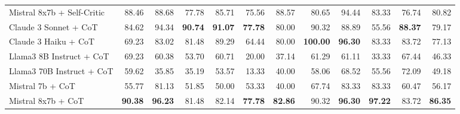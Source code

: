 \begin{table}[H]
{\begin{tabular}{lrrrrrrrrrrr}
\rowcolor{Gray}
Mistral 8x7b + Self-Critic & 88.46 & 88.68 & 77.78 & 85.71 & 75.56 & 88.57 & 80.65 & 94.44 & 83.33 & 76.74 & 80.82 \\
Claude 3 Sonnet + CoT & 84.62 & 94.34 & \textbf{90.74} & \textbf{91.07} & \textbf{77.78} & 80.00 & 90.32 & 88.89 & 55.56 & \textbf{88.37} & 79.17 \\
Claude 3 Haiku + CoT & 69.23 & 83.02 & 81.48 & 89.29 & 64.44 & 80.00 & \textbf{100.00} & \textbf{96.30} & 83.33 & 83.72 & 77.13 \\
Llama3 8B Instruct + CoT & 69.23 & 60.38 & 53.70 & 60.71 & 20.00 & 37.14 & 61.29 & 61.11 & 33.33 & 67.44 & 46.33 \\
Llama3 70B Instruct + CoT & 59.62 & 35.85 & 35.19 & 53.57 & 13.33 & 40.00 & 58.06 & 68.52 & 55.56 & 72.09 & 49.18 \\
Mistral 7b + CoT & 55.77 & 81.13 & 51.85 & 50.00 & 53.33 & 40.00 & 67.74 & 83.33 & 83.33 & 60.47 & 56.17 \\
Mistral 8x7b + CoT & \textbf{90.38} & \textbf{96.23} & 81.48 & 82.14 & \textbf{77.78} & \textbf{82.86} & 90.32 & \textbf{96.30} & \textbf{97.22} & 83.72 & \textbf{86.35} \\
\bottomrule
\end{tabular}
}
   \label{tab:explicit_20topics_10}
\end{table}






